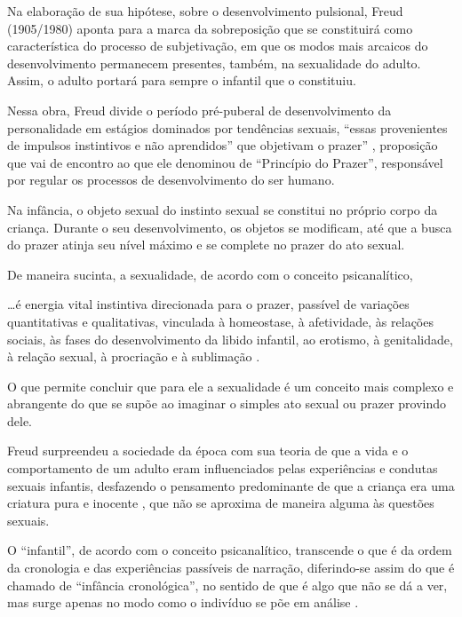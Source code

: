  \begin{citacao}
	Na elaboração de sua hipótese, sobre o desenvolvimento pulsional, Freud (1905/1980) aponta para a marca da sobreposição que se constituirá como característica do processo de subjetivação, em que os modos mais arcaicos do desenvolvimento permanecem presentes, também, na sexualidade do adulto. Assim, o adulto portará para sempre o infantil que o constituiu.
\end{citacao}

Nessa obra, Freud divide o período pré-puberal de desenvolvimento da personalidade em estágios dominados por tendências sexuais, ``essas provenientes de impulsos instintivos e não aprendidos'' que objetivam o prazer'' \cite[p. 2]{SCHINDHELM2011}, proposição que vai de encontro ao que ele denominou de ``Princípio do Prazer'', responsável por regular os processos de desenvolvimento do ser humano.

Na infância, o objeto sexual do instinto sexual se constitui no próprio corpo da criança. Durante o seu desenvolvimento, os objetos se modificam, até que a busca do prazer atinja seu nível máximo e se complete no prazer do ato sexual.

De maneira sucinta, a sexualidade, de acordo com o conceito psicanalítico, 

\begin{citacao}
	\ldots é energia vital instintiva direcionada para o prazer, passível de variações quantitativas e qualitativas, vinculada à homeostase, à afetividade, às relações sociais, às fases do desenvolvimento da libido infantil, ao erotismo, à genitalidade, à relação sexual, à procriação e à sublimação \cite[p. 117]{BEARZOTI1994}.
\end{citacao}

O que permite concluir que para ele a sexualidade é um conceito mais complexo e abrangente do que se supõe ao imaginar o simples ato sexual ou prazer provindo dele.

Freud surpreendeu a sociedade da época com sua teoria de que a vida e o comportamento de um adulto eram influenciados pelas experiências e condutas sexuais infantis, desfazendo o pensamento predominante de que a criança era uma criatura pura e inocente \cite{SCHINDHELM2011}, que não se aproxima de maneira alguma às questões sexuais.

O ``infantil'', de acordo com o conceito psicanalítico, transcende o que é da ordem da cronologia e das experiências passíveis de narração, diferindo-se assim do que é chamado de ``infância cronológica'', no sentido de que é algo que não se dá a ver, mas surge apenas no modo como o indivíduo se põe em análise \cite[p. 66]{ZAVARONI2007}.

